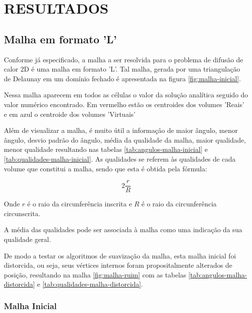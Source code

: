 \chapter[RESULTADOS]{RESULTADOS}

\section{Malha em formato 'L'}
Conforme já especificado, a malha a ser resolvida para o problema de difusão de calor 2D é uma malha em formato 'L'. Tal malha, gerada por uma triangulação de Delaunay em um domínio fechado é apresentada na figura \ref{fig:malha-inicial}.

Nessa malha aparecem em todos as células o valor da solução analítica seguido do valor numérico encontrado. Em vermelho estão os centroides dos volumes 'Reais' e em azul o centroide dos volumes 'Virtuais'

Além de visualizar a malha, é muito útil a informação de maior ângulo, menor ângulo, desvio padrão do ângulo, média da qualidade da malha, maior qualidade, menor qualidade resultando nas tabelas \ref{tab:angulos-malha-inicial} e \ref{tab:qualidades-malha-inicial}. As qualidades se referem às qualidades de cada volume que constitui a malha, sendo que esta é obtida pela fórmula:

\begin{equation}
    2 \frac{r}{R}
    \label{eq:qualidade}
\end{equation}

Onde $r$ é o raio da circunferência inscrita e $R$ é o raio da circunferência circunscrita.

A média das qualidades pode ser associada à malha como uma indicação da sua qualidade geral.

De modo a testar os algoritmos de suavização da malha, esta malha inicial foi distorcida, ou seja, seus vértices internos foram propositalmente alterados de posição, resultando na malha \ref{fig:malha-ruim} com as tabelas \ref{tab:angulos-malha-distorcida} e \ref{tab:qualidades-malha-distorcida}.

\newpage
\subsection{Malha Inicial}

